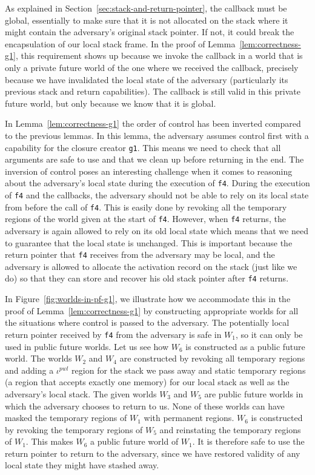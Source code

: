 \documentclass[compsoc,conference,letterpaper,fleqn]{IEEEtran}
\newcommand{\var}[1]{\mathit{#1}}
\newcommand{\pwl}{\var{pwl}}
\begin{document}
As explained in Section~\ref{sec:stack-and-return-pointer}, the callback must be
global, essentially to make sure that it is not allocated on the stack where it
might contain the adversary's original stack pointer. If not, it could break the
encapsulation of our local stack frame. In the proof of
Lemma~\ref{lem:correctness-g1}, this requirement shows up because we invoke the
callback in a world that is only a private future world of the one where we
received the callback, precisely because we have invalidated the local state of
the adversary (particularly its previous stack and return capabilities). The
callback is still valid in this private future world, but only because we know
that it is global.

In Lemma~\ref{lem:correctness-g1} the order of control has been inverted
compared to the previous lemmas. In this lemma, the adversary assumes control
first with a capability for the closure creator \texttt{\footnotesize{g1}}. This means we need
to check that all arguments are safe to use and that we clean up before
returning in the end. The inversion of control poses an interesting challenge
when it comes to reasoning about the adversary's local state during the
execution of \texttt{\footnotesize{f4}}. During the execution of \texttt{\footnotesize{f4}} and the callbacks,
the adversary should not be able to rely on its local state from before the call
of \texttt{\footnotesize{f4}}. This is easily done by revoking all the temporary regions of the
world given at the start of \texttt{\footnotesize{f4}}. However, when \texttt{\footnotesize{f4}} returns, the
adversary is again allowed to rely on its old local state which means that we
need to guarantee that the local state is unchanged. This is important because
the return pointer that \texttt{\footnotesize{f4}} receives from the adversary may be local,
and the adversary is allowed to allocate the activation record on the stack
(just like we do) so that they can store and recover his old stack pointer after
\texttt{\footnotesize{f4}} returns.

In Figure~\ref{fig:worlds-in-pf-g1}, we illustrate how we accommodate this in the
proof of Lemma~\ref{lem:correctness-g1} by constructing appropriate worlds for
all the situations where control is passed to the adversary. The potentially
local return pointer received by \texttt{\footnotesize{f4}} from the adversary is safe in
$W_1$, so it can only be used in public future worlds. Let us see how $W_6$ is
constructed as a public future world. The worlds $W_2$ and $W_4$ are constructed
by revoking all temporary regions and adding a $\iota^\pwl$ region for the stack
we pass away and static temporary regions (a region that accepts exactly one
memory) for our local stack as well as the adversary's local stack. The given
worlds $W_3$ and $W_5$ are public future worlds in which the adversary chooses
to return to us. None of these worlds can have masked the temporary regions of
$W_1$ with permanent regions. $W_6$ is constructed by revoking the temporary
regions of $W_5$ and reinstating the temporary regions of $W_1$. This makes
$W_6$ a public future world of $W_1$. It is therefore safe to use the return
pointer to return to the adversary, since we have restored validity of any local
state they might have stashed away.
\end{document}
